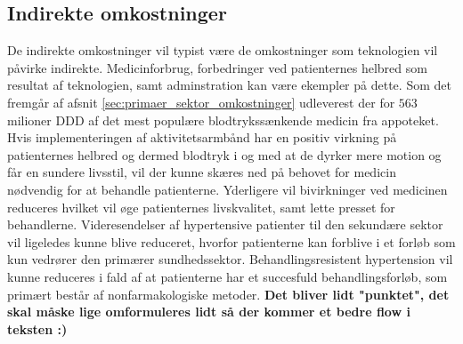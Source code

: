 \subsection{Indirekte omkostninger}
De indirekte omkostninger vil typist være de omkostninger som teknologien vil påvirke indirekte. Medicinforbrug, forbedringer ved patienternes helbred som resultat af teknologien, samt adminstration kan være ekempler på dette. 
Som det fremgår af afsnit \autoref{sec:primaer_sektor_omkostninger} udleverest der for $563$ milioner DDD af det mest populære blodtrykssænkende medicin fra appoteket. Hvis implementeringen af aktivitetsarmbånd har en positiv virkning på patienternes helbred og dermed blodtryk i og med at de dyrker mere motion og får en sundere livsstil, vil der kunne skæres ned på behovet for medicin nødvendig for at behandle patienterne. Yderligere vil bivirkninger ved medicinen reduceres hvilket vil øge patienternes livskvalitet, samt lette presset for behandlerne. 
Videresendelser af hypertensive patienter til den sekundære sektor vil ligeledes kunne blive reduceret, hvorfor patienterne kan forblive i et forløb som kun vedrører den primærer sundhedssektor. Behandlingsresistent hypertension vil kunne reduceres i fald af at patienterne har et succesfuld behandlingsforløb, som primært består af nonfarmakologiske metoder.  \textbf{Det bliver lidt "punktet", det skal måske lige omformuleres lidt så der kommer et bedre flow i teksten :) }













\begin{comment}
Hvad koster et Fitbit Flex? 
Hvilke besparelser tilbydes der så sundhedsektoren? 

Hvad koster det så at introducere patienterne til teknologien? 
	Hvad dækker den her introduktion minimum over, for at kunne anvende armbåndet? (Anvendelse af app og hvordan den skal oplades.)
	
Hvad koster det hvis de har spørgsmål vedr. teknologien? 


Langsigtet omkostninger - hvis behandlingen hjælper/ikke hjælper
- Besparelser vedr. medicinering 
- Besparelser vedr. ambulant forløb 
- Forebyggelse af behandlingsresistent hypertension = $$$$



EVT: Dags-takster i sekundær sektor (Ambulant).



En model i almen praktsis for implementeringen af aktivitetsarmbånd?

Honorartabel = \citep{honorartabel2016}
\end{comment}